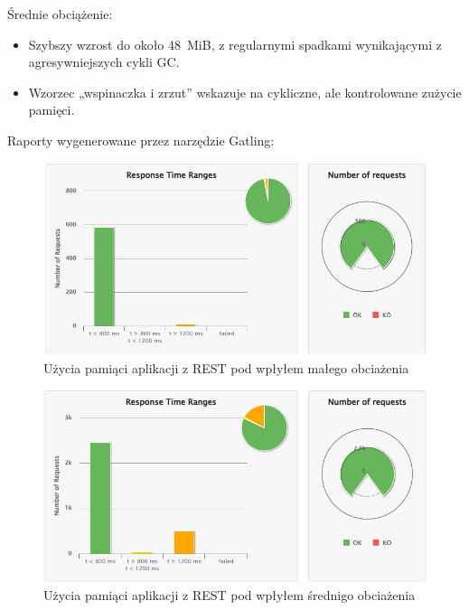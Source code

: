 \documentclass[runningheads,12pt]{llncs}
\begin{document}
Średnie obciążenie:

\begin{itemize}
  \item Szybszy wzrost do około 48~MiB, z regularnymi spadkami wynikającymi z agresywniejszych cykli GC.
  \item Wzorzec „wspinaczka i zrzut” wskazuje na cykliczne, ale kontrolowane zużycie pamięci.
\end{itemize}

Raporty wygenerowane przez narzędzie Gatling:


\begin{figure}
    \includegraphics[width=\linewidth]{images/rest-gatling-low-graph.jpg}
    \caption{Użycia pamiąci aplikacji z REST pod wpłyłem małego obciażenia} \label{fig1}
\end{figure}

\begin{figure}
    \includegraphics[width=\linewidth]{images/rest-gatling-moddle-rest.jpg}
    \caption{Użycia pamiąci aplikacji z REST pod wpłyłem średnigo obciażenia} \label{fig1}
\end{figure}
\end{document}

